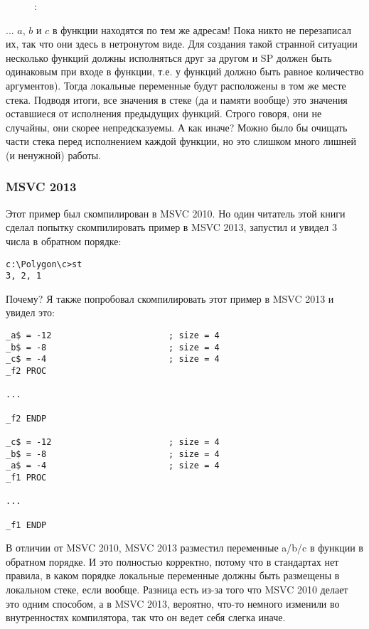 \begin{figure}[H]
\centering
{}
\caption{\olly: }
\label{fig:stack_noise_olly2}
\end{figure}

... $a$, $b$ и $c$ в функции  находятся по тем же адресам!
Пока никто не перезаписал их, так что они здесь в нетронутом виде.
Для создания такой странной ситуации несколько функций должны исполняться друг за другом
и \ac{SP} должен быть одинаковым при входе в функции, т.е. у функций должно быть равное количество
аргументов). Тогда локальные переменные будут расположены в том же месте стека.
Подводя итоги, все значения в стеке (да и памяти вообще) это значения оставшиеся от 
исполнения предыдущих функций.
Строго говоря, они не случайны, они скорее непредсказуемы.
А как иначе?
Можно было бы очищать части стека перед исполнением каждой функции,
но это слишком много лишней (и ненужной) работы.

\subsubsection{MSVC 2013}

Этот пример был скомпилирован в MSVC 2010.
Но один читатель этой книги сделал попытку скомпилировать пример в MSVC 2013, запустил и увидел 3 числа в обратном порядке:

\begin{lstlisting}
c:\Polygon\c>st
3, 2, 1
\end{lstlisting}

Почему?
Я также попробовал скомпилировать этот пример в MSVC 2013 и увидел это:

\begin{lstlisting}[caption=MSVC 2013]
_a$ = -12						; size = 4
_b$ = -8						; size = 4
_c$ = -4						; size = 4
_f2	PROC

...

_f2	ENDP

_c$ = -12						; size = 4
_b$ = -8						; size = 4
_a$ = -4						; size = 4
_f1	PROC

...

_f1	ENDP
\end{lstlisting}

В отличии от MSVC 2010, MSVC 2013 разместил переменные a/b/c в функции  в обратном порядке.
И это полностью корректно, потому что в стандартах \CCpp нет правила, в каком порядке локальные переменные должны быть размещены в локальном стеке, если вообще.
Разница есть из-за того что MSVC 2010 делает это одним способом, а в MSVC 2013, вероятно, что-то немного изменили во внутренностях компилятора, так что он ведет себя слегка иначе.

